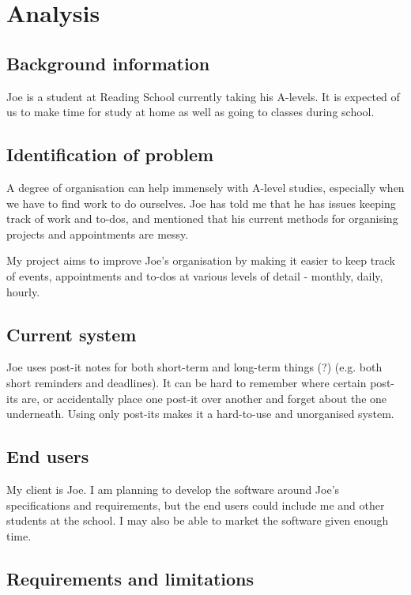 \section{Analysis}

\subsection{Background information}

Joe is a student at Reading School currently taking his A-levels. It is
expected of us to make time for study at home as well as going to
classes during school.


\subsection{Identification of problem}

A degree of organisation can help immensely with A-level studies,
especially when we have to find work to do ourselves. Joe has told me
that he has issues keeping track of work and to-dos, and mentioned that
his current methods for organising projects and appointments are messy.

My project aims to improve Joe's organisation by making it easier to
keep track of events, appointments and to-dos at various levels of
detail - monthly, daily, hourly.

\subsection{Current system}

Joe uses post-it notes for both short-term and long-term things (?)
(e.g. both short reminders and deadlines). It can be hard to remember
where certain post-its are, or accidentally place one post-it over
another and forget about the one underneath. Using only post-its makes
it a hard-to-use and unorganised system.


\subsection{End users}

My client is Joe. I am planning to develop the software around Joe's
specifications and requirements, but the end users could include me and
other students at the school. I may also be able to market the software
given enough time.


\subsection{Requirements and limitations}

